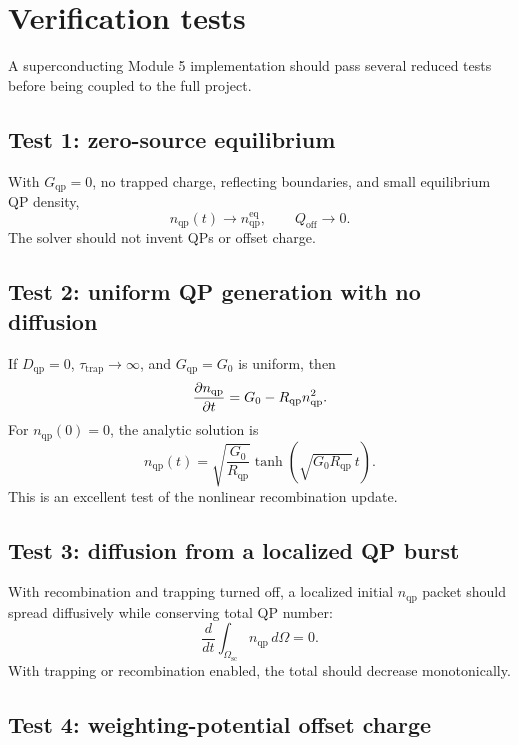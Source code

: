 \documentclass[11pt]{article}
\newcommand{\Om}{\Omega}
\newcommand{\Osc}{\Omega_{\mathrm{sc}}}
\newcommand{\nqp}{n_{\mathrm{qp}}}
\newcommand{\Dqp}{D_{\mathrm{qp}}}
\newcommand{\Gqp}{G_{\mathrm{qp}}}
\newcommand{\Rqp}{R_{\mathrm{qp}}}
\newcommand{\tautrap}{\tau_{\mathrm{trap}}}
\newcommand{\Qoff}{Q_{\mathrm{off}}}
\begin{document}
\section{Verification tests}

A superconducting Module 5 implementation should pass several reduced tests before being coupled to the full project.

\subsection{Test 1: zero-source equilibrium}

With \(\Gqp=0\), no trapped charge, reflecting boundaries, and small equilibrium QP density,
\begin{equation}
\nqp(t) \rightarrow \nqp^{\mathrm{eq}},\qquad \Qoff\rightarrow 0.
\end{equation}
The solver should not invent QPs or offset charge.

\subsection{Test 2: uniform QP generation with no diffusion}

If \(\Dqp=0\), \(\tautrap\rightarrow\infty\), and \(\Gqp=G_0\) is uniform, then
\begin{equation}
\pdv{\nqp}{t}=G_0-\Rqp\nqp^2.
\end{equation}
For \(\nqp(0)=0\), the analytic solution is
\begin{equation}
\nqp(t)=\sqrt{\frac{G_0}{\Rqp}}\tanh\left(\sqrt{G_0\Rqp}\,t\right).
\end{equation}
This is an excellent test of the nonlinear recombination update.

\subsection{Test 3: diffusion from a localized QP burst}

With recombination and trapping turned off, a localized initial \(\nqp\) packet should spread diffusively while conserving total QP number:
\begin{equation}
\frac{d}{dt}\int_{\Osc}\nqp\,d\Om=0.
\end{equation}
With trapping or recombination enabled, the total should decrease monotonically.

\subsection{Test 4: weighting-potential offset charge}
\end{document}
